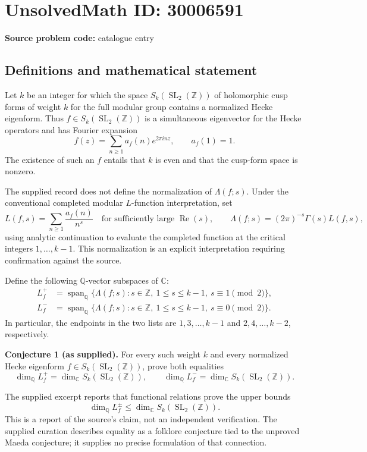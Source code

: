 \documentclass[11pt]{article}
\newcommand{\Z}{\mathbb{Z}}
\newcommand{\Q}{\mathbb{Q}}
\newcommand{\C}{\mathbb{C}}
\begin{document}
\section*{UnsolvedMath ID: 30006591}
\textbf{Source problem code:} catalogue entry
\subsection{Definitions and mathematical statement}
Let \(k\) be an integer for which the space \(S_k(\operatorname{SL}_2(\Z))\) of holomorphic cusp forms of weight \(k\) for the full modular group contains a normalized Hecke eigenform. Thus \(f\in S_k(\operatorname{SL}_2(\Z))\) is a simultaneous eigenvector for the Hecke operators and has Fourier expansion
\[
f(z)=\sum_{n\geq 1}a_f(n)e^{2\pi i n z},\qquad a_f(1)=1.
\]
The existence of such an \(f\) entails that \(k\) is even and that the cusp-form space is nonzero.

The supplied record does not define the normalization of \(\Lambda(f;s)\). Under the conventional completed modular \(L\)-function interpretation, set
\[
L(f,s)=\sum_{n\geq 1}\frac{a_f(n)}{n^s}
\quad\text{for sufficiently large }\operatorname{Re}(s),
\qquad
\Lambda(f;s)=(2\pi)^{-s}\Gamma(s)L(f,s),
\]
using analytic continuation to evaluate the completed function at the critical integers \(1,\ldots,k-1\). This normalization is an explicit interpretation requiring confirmation against the source.

Define the following \(\Q\)-vector subspaces of \(\C\):
\[
\begin{aligned}
L_f^+&=\operatorname{span}_{\Q}\{\Lambda(f;s):s\in\Z,\ 1\leq s\leq k-1,\ s\equiv 1\pmod 2\},\\
L_f^-&=\operatorname{span}_{\Q}\{\Lambda(f;s):s\in\Z,\ 1\leq s\leq k-1,\ s\equiv 0\pmod 2\}.
\end{aligned}
\]
In particular, the endpoints in the two lists are \(1,3,\ldots,k-1\) and \(2,4,\ldots,k-2\), respectively.

\textbf{Conjecture 1 (as supplied).} For every such weight \(k\) and every normalized Hecke eigenform \(f\in S_k(\operatorname{SL}_2(\Z))\), prove both equalities
\[
\dim_{\Q}L_f^+=\dim_{\C}S_k(\operatorname{SL}_2(\Z)),
\qquad
\dim_{\Q}L_f^-=\dim_{\C}S_k(\operatorname{SL}_2(\Z)).
\]

The supplied excerpt reports that functional relations prove the upper bounds
\[
\dim_{\Q}L_f^\pm\leq\dim_{\C}S_k(\operatorname{SL}_2(\Z)).
\]
This is a report of the source's claim, not an independent verification. The supplied curation describes equality as a folklore conjecture tied to the unproved Maeda conjecture; it supplies no precise formulation of that connection.
\end{document}
